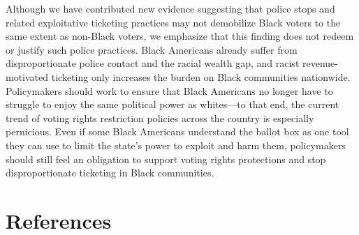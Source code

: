 \documentclass[
  12pt,
]{article}
\begin{document}
Although we have contributed new evidence suggesting that police stops and related exploitative ticketing practices may not demobilize Black voters to the same extent as non-Black voters, we emphasize that this finding does not redeem or justify such police practices. Black Americans already suffer from disproportionate police contact and the racial wealth gap, and racist revenue-motivated ticketing only increases the burden on Black communities nationwide. Policymakers should work to ensure that Black Americans no longer have to struggle to enjoy the same political power as whites---to that end, the current trend of voting rights restriction policies across the country is especially pernicious. Even if some Black Americans understand the ballot box as one tool they can use to limit the state's power to exploit and harm them, policymakers should still feel an obligation to support voting rights protections and stop disproportionate ticketing in Black communities.

\newpage

\hypertarget{references}{%
\section*{References}\label{references}}
\end{document}
